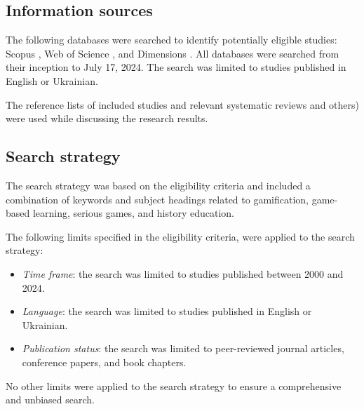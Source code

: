 \documentclass[a4paper,fleqn]{cas-sc}
\begin{document}
\subsection{Information sources}


The following databases were searched to identify potentially eligible studies: Scopus \citep{scopus}, Web of Science \citep{wos}, and Dimensions \citep{dimensions}. All databases were searched from their inception to July 17, 2024. The search was limited to studies published in English or Ukrainian.

The reference lists of included studies and relevant systematic reviews \citep{Oceja2022419} and others) were used while discussing the research results.


\subsection{Search strategy}


The search strategy was based on the eligibility criteria and included a combination of keywords and subject headings related to gamification, game-based learning, serious games, and history education.

The following limits specified in the eligibility criteria, were applied to the search strategy:

\begin{itemize}[noitemsep]
 \item \textit{Time frame}: the search was limited to studies published between 2000 and 2024.
 
 \item \textit{Language}: the search was limited to studies published in English or Ukrainian. 
 
 \item \textit{Publication status}: the search was limited to peer-reviewed journal articles, conference papers, and book chapters.
\end{itemize}

No other limits were applied to the search strategy to ensure a comprehensive and unbiased search.
\end{document}
